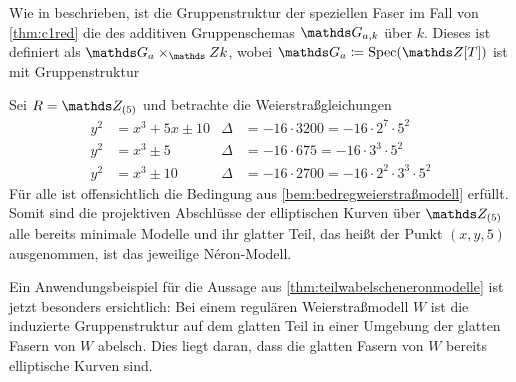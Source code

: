 Wie in \cite[Chapter 1.5]{neron} beschrieben, ist die
Gruppenstruktur der speziellen Faser im Fall von \ref{thm:c1red} die
des additiven Gruppenschemas $\G_{a,k}$ über $k$. Dieses ist definiert
als $\G_{a}\times_\Z k$, wobei $\G_{a}\coloneqq\Spec(\Z[T])$ ist mit
Gruppenstruktur
\begin{center}
\end{center}
    
\begin{Beispiel}
  Sei $R=\Z_{(5)}$ und betrachte die Weierstraßgleichungen
  \begin{align*}
    y^2&=x^3+5x\pm 10
    & \Delta&=-16\cdot3200=-16\cdot2^7\cdot5^2\\
    y^2&=x^3\pm 5
    & \Delta&=-16\cdot675=-16\cdot3^3\cdot5^2\\
    y^2&=x^3\pm 10
    & \Delta&=-16\cdot2700=-16\cdot2^2\cdot3^3\cdot5^2
  \end{align*}
  Für alle ist offensichtlich die Bedingung aus
  \ref{bem:bedregweierstraßmodell} erfüllt.
  Somit sind die projektiven Abschlüsse der elliptischen Kurven über
  $\Z_{(5)}$ alle bereits minimale Modelle und ihr glatter Teil,
  das heißt der Punkt $(x,y,5)$ ausgenommen, ist das jeweilige
  Néron-Modell.
\end{Beispiel}

\begin{Beispiel}
  Ein Anwendungsbeispiel für die Aussage aus
  \ref{thm:teilwabelscheneronmodelle} ist jetzt besonders ersichtlich:
  Bei einem regulären Weierstraßmodell $W$ ist die induzierte
  Gruppenstruktur auf dem glatten Teil in einer Umgebung der glatten
  Fasern von $W$ abelsch.
  Dies liegt daran, dass die glatten Fasern von $W$ bereits
  elliptische Kurven sind.
\end{Beispiel}

